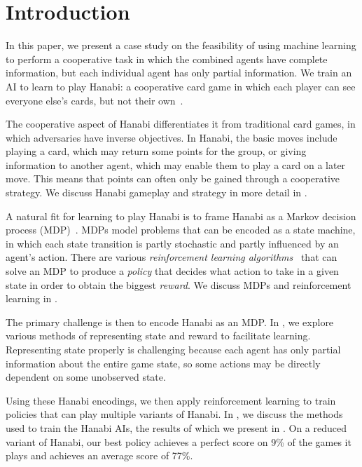 \section{Introduction}\label{sec:intro}

In this paper, we present a case study on the feasibility of using machine
learning to perform a cooperative task in which the combined agents have
complete information, but each individual agent has only partial information.
We train an AI to learn to play Hanabi: a cooperative card game in which each
player can see everyone else's cards, but not their own~\cite{hanabiboardgame,
hanabiwiki}.

The cooperative aspect of Hanabi differentiates it from traditional card games,
in which adversaries have inverse objectives. In Hanabi, the basic moves
include playing a card, which may return some points for the group, or giving
information to another agent, which may enable them to play a card on a later
move. This means that points can often only be gained through a cooperative
strategy. We discuss Hanabi gameplay and strategy in more detail in
.

A natural fit for learning to play Hanabi is to frame Hanabi as a Markov
decision process (MDP)~\cite{mdp}. MDPs model problems that can be encoded as a
state machine, in which each state transition is partly stochastic and partly
influenced by an agent's action. There are various \emph{reinforcement learning
algorithms}~\cite{rubinstein2013cross, policyoptimizationNIPS2016, cmaes, TRPO}
that can solve an MDP to produce a \emph{policy} that decides what action to
take in a given state in order to obtain the biggest \emph{reward}. We discuss
MDPs and reinforcement learning in .

The primary challenge is then to encode Hanabi as an MDP. In
, we explore various methods of representing state and reward
to facilitate learning. Representing state properly is challenging because each
agent has only partial information about the entire game state, so some actions
may be directly dependent on some unobserved state.

Using these Hanabi encodings, we then apply reinforcement learning to train
policies that can play multiple variants of Hanabi. In ,
we discuss the methods used to train the Hanabi AIs, the results of which we
present in .  On a reduced variant of Hanabi, our best policy
achieves a perfect score on 9\% of the games it plays and achieves an average
score of 77\%.
